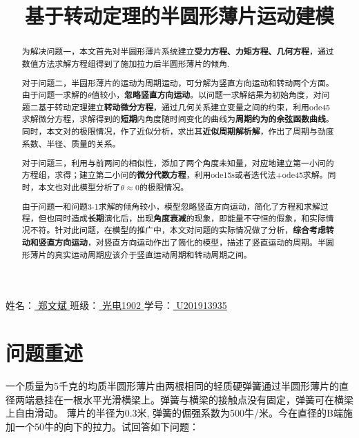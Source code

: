 \documentclass[withoutpreface,bwprint]{cumcmthesis} %
\title{基于转动定理的半圆形薄片运动建模}
\begin{document}
	
	\maketitle
	\begin{center}
	姓名：\underline{ 郑文斌 } 班级：\underline{ 光电1902 } 学号：\underline{ U201913935}
\end{center}

	\begin{abstract}
		 为解决问题一，本文首先对半圆形薄片系统建立\textbf{受力方程、力矩方程、几何方程}，通过数值方法求解方程组得到了施加拉力后半圆形薄片的倾角.
		 
		 
		 对于问题二，半圆形薄片的运动为周期运动，可分解为竖直方向运动和转动两个方面。由于问题一求解的$\theta$值较小，\textbf{忽略竖直方向运动}。以问题一求解结果为初始角度，对问题二基于转动定理建立\textbf{转动微分方程}，通过几何关系建立变量之间的约束，利用ode45求解微分方程，求解得到的\textbf{短期}内角度随时间变化的曲线为\textbf{周期约为的余弦函数曲线}。同时，本文对的极限情况，作了近似分析，求出其\textbf{近似周期解析解}，作出了周期与劲度系数、半径、质量的关系。
		
		对于问题三，利用与前两问的相似性，添加了两个角度未知量，对应地建立第一小问的方程组，求得；建立第二小问的\textbf{微分代数方程}，利用ode15s或者迭代法+ode45求解。同时，本文也对此模型分析了$\theta \approx 0$的极限情况。
		
		由于问题一和问题3-1求解的倾角较小，模型忽略竖直方向运动，简化了方程和求解过程，但也同时造成\textbf{长期}演化后，出现\textbf{角度衰减}的现象，即能量不守恒的假象，和实际情况不符。针对此问题，在模型的推广中，本文对问题的实际情况做了分析，\textbf{综合考虑转动和竖直方向运动}，对竖直方向运动作出了简化的模型，描述了竖直运动的周期。半圆形薄片的真实运动周期应该介于竖直运动周期和转动周期之间。
		
	\end{abstract}
	
	\tableofcontents
	
	\newpage
	
	\section{问题重述}
	一个质量为5千克的均质半圆形薄片由两根相同的轻质硬弹簧通过半圆形薄片的直径两端悬挂在一根水平光滑横梁上。弹簧与横梁的接触点没有固定，弹簧可在横梁上自由滑动。
	薄片的半径为0.3米, 弹簧的倔强系数为500牛/米。今在直径的B端施加一个50牛的向下的拉力。试回答如下问题：
	
\end{document}
